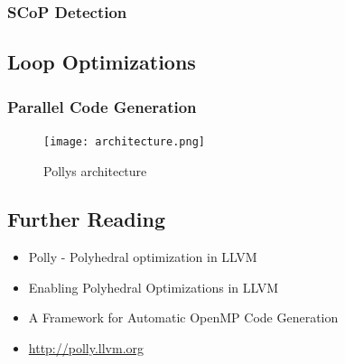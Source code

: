 \red
\begin{shaded}

\subsubsection{SCoP Detection}



\subsection{Loop Optimizations}

\subsubsection{Parallel Code Generation}

\end{shaded}



\begin{figure}[htbp]
  \centering
  \texttt{[image: architecture.png]}
  \caption{Pollys architecture \cite{Polly:Online}}
  \label{fig:PollyArchitecture}  
\end{figure}


\yellow
\begin{shaded}
\subsection*{Further Reading}

\yellow
\begin{itemize}
  \item Polly - Polyhedral optimization in LLVM \cite{grosser.11.impact}  
  \item Enabling Polyhedral Optimizations in LLVM \cite{grosser:thesis}
  \item A Framework for Automatic OpenMP Code Generation \cite{raghesh2011framework}
  \item \url{http://polly.llvm.org} \nocite{Polly:Online}
\end{itemize}

\end{shaded}


